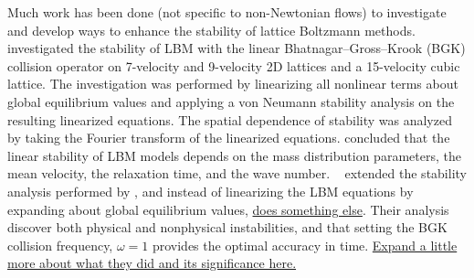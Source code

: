 \documentclass{article}
\begin{document}
Much work has been done (not specific to non-Newtonian flows) to investigate and develop ways to enhance the stability of lattice Boltzmann methods.
\citet{sterling1993stability,sterling1996stability} investigated the stability of LBM with the linear Bhatnagar--Gross--Krook (BGK) collision operator on 7-velocity and 9-velocity 2D lattices and a 15-velocity cubic lattice.
The investigation was performed by linearizing all nonlinear terms about global equilibrium values and applying a von Neumann stability analysis on the resulting linearized equations.
The spatial dependence of stability was analyzed by taking the Fourier transform of the linearized equations.
\citeauthor{sterling1993stability} concluded that the linear stability of LBM models depends on the mass distribution parameters, the mean velocity, the relaxation time, and the wave number. %
~\citet{worthing1997stability} extended the stability analysis performed by \citeauthor{sterling1993stability}, and instead of linearizing the LBM equations by expanding about global equilibrium values, \citeauthor{worthing1997stability} \ul{does something else}.
Their analysis discover both physical and nonphysical instabilities, and that setting the BGK collision frequency, $\omega = 1$ provides the optimal accuracy in time. %
\ul{Expand a little more about what they did and its significance here.}
\end{document}
